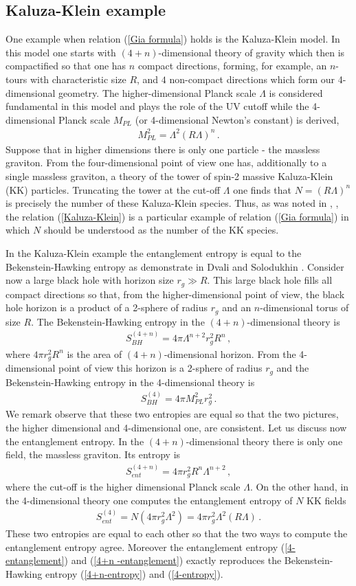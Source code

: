 \documentclass[12pt]{article}
\def\be{\begin{eqnarray}}
\def\ee{\end{eqnarray}}
\def\lb{\label}
\begin{document}
\subsection{Kaluza-Klein example} 
One example when relation (\ref{Gia formula}) holds is the Kaluza-Klein model. In this model one starts with $(4+n)$-dimensional theory of gravity which then is compactified so that one has $n$ compact directions, forming, for example, an  $n$-tours with characteristic size $R$, and $4$ non-compact directions which form our 4-dimensional geometry. The higher-dimensional Planck scale $\Lambda$ is considered fundamental in this model and plays the role of the UV cutoff while the 4-dimensional Planck scale $M_{PL}$ (or 4-dimensional Newton's constant) is derived,
\be
M^2_{PL}=\Lambda^2(R\Lambda)^n\, .
\lb{Kaluza-Klein}
\ee
Suppose that in higher dimensions there is only one particle -  the massless graviton. From the four-dimensional point of view one has, additionally to a single massless graviton,   a theory of the tower of spin-2 massive Kaluza-Klein (KK) particles.  Truncating  the tower at the cut-off $\Lambda$ one finds that $N=(R\Lambda)^n$ is precisely the number of these Kaluza-Klein species. Thus, as was noted in \cite{Dvali:2007hz}, \cite{Dvali:2007wp}, the relation (\ref{Kaluza-Klein}) is a particular example of relation (\ref{Gia formula})
in which $N$ should be understood as the number of the KK species.

In the Kaluza-Klein example the entanglement entropy is equal to the Bekenstein-Hawking entropy as demonstrate in Dvali and Solodukhin \cite{Dvali:2008jb}. Consider now a large black hole with horizon size $r_g\gg R$. This large black hole fills all  compact directions so that, from the higher-dimensional point of view, the black hole  horizon is a product of a 2-sphere of radius $r_g$ and an $n$-dimensional torus of size $R$.  The Bekenstein-Hawking entropy in the  $(4+n)$-dimensional theory is
\be
S^{(4+n)}_{BH}=4\pi\Lambda^{n+2}r_g^2 R^n\, ,
\lb{4+n-entropy}
\ee
where $4\pi r^2_g R^n$ is the area of $(4+n)$-dimensional horizon. From the 4-dimensional point of view this horizon is a 2-sphere of radius $r_g$ and the Bekenstein-Hawking entropy
in the 4-dimensional theory is
\be
S^{(4)}_{BH}=4\pi M^2_{PL}r^2_g\, .
\lb{4-entropy}
\ee
We remark observe  that these two entropies are equal so that the two pictures, the higher dimensional and 4-dimensional one, are consistent.
Let us discuss now the entanglement entropy. In the $(4+n)$-dimensional theory there is only one field, the massless graviton. Its entropy is
\be
S_{ent}^{(4+n)}=4\pi r_g^2R^n\Lambda^{n+2}\, ,
\lb{4+n -entanglement}
\ee
where the cut-off is the higher dimensional Planck scale $\Lambda$. On the other hand, in the 4-dimensional theory one computes the entanglement entropy of $N$ KK fields
\be
S^{(4)}_{ent}=N (4\pi r_g^2\Lambda^2)=4\pi r_g^2 \Lambda^2 (R\Lambda )\, .
\lb{4-entanglement}
\ee
These two entropies are equal to each other so that the two ways to compute the entanglement entropy  agree. Moreover the entanglement entropy (\ref{4-entanglement}) and             
  (\ref{4+n -entanglement}) exactly reproduces  the Bekenstein-Hawking entropy (\ref{4+n-entropy}) and  (\ref{4-entropy}).   
  
\end{document}

